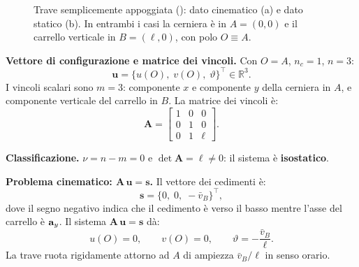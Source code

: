 \begin{esempio}
\begin{figure}[ht]
		\caption{Trave semplicemente appoggiata
			(): dato cinematico (a) e dato
			statico (b). In entrambi i casi la cerniera è in $A=(0,0)$
			e il carrello verticale in $B=(\ell,0)$, con polo
			$O\equiv A$.}
		\label{fig:trave_semplice}
	\end{figure}
	
	\begin{svolgimento}
		
		\noindent\textbf{Vettore di configurazione e matrice
			dei vincoli.}
		Con $O = A$, $n_c = 1$, $n = 3$:
		\begin{equation*}
			\bm{u} =
			\bigl\{u(O),\; v(O),\; \vartheta
			\bigr\}^\top \in \mathbb{R}^3.
		\end{equation*}
		I vincoli scalari sono $m = 3$: componente $x$ e
		componente $y$ della cerniera in $A$, e componente
		verticale del carrello in $B$. La matrice dei vincoli
		è:
		\begin{equation*}\label{eq:A_es1}
			\bm{A} =
			\begin{bmatrix}
				1 & 0 & 0 \\
				0 & 1 & 0 \\
				0 & 1 & \ell
			\end{bmatrix}.
		\end{equation*}
		
		\noindent\textbf{Classificazione.}
		$\nu = n - m = 0$ e $\det\bm{A} = \ell \neq 0$:
		il sistema è \textbf{isostatico}.
		
		\smallskip
		\noindent\textbf{Problema cinematico:
			$\bm{A}\,\bm{u} = \bm{s}$.}
		Il vettore dei cedimenti è:
		\begin{equation*}
			\bm{s} =
			\bigl\{0,\; 0,\; -\bar{v}_B
			\bigr\}^\top,
		\end{equation*}
		dove il segno negativo indica che il cedimento è
		verso il basso mentre l'asse del carrello è $\mathbf{a}_y$.
		Il sistema $\bm{A}\,\bm{u} = \bm{s}$ dà:
		\begin{equation*}
			u(O) = 0, \qquad v(O) = 0, \qquad
			\vartheta = -\frac{\bar{v}_B}{\ell}.
		\end{equation*}
		La trave ruota rigidamente attorno ad $A$ di ampiezza
		$\bar{v}_B/\ell$ in senso orario.
		

\end{svolgimento}
\end{esempio}
